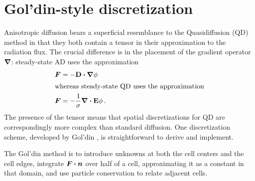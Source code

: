 \section{Gol'din-style discretization}

Anisotropic diffusion bears a superficial resemblance to the
Quasidiffusion (QD) method in that they both contain a tensor in their
approximation to the radiation flux. The crucial difference is in the placement
of the gradient operator $\bm{\nabla}$: steady-state AD uses the approximation
\begin{align*}
  \bm{F} &= - \mathbf{D} \bm{\cdot} \bm{\nabla} \phi
  \\ 
  \intertext{whereas steady-state QD uses the approximation}
  \bm{F} &= - \frac{1}{\sigma} \bm{\nabla} \bm{\cdot} \mathbf{E} \phi\,.
\end{align*}
The presence of the tensor means that spatial discretizations for QD are
correspondingly more complex than standard diffusion. One discretization scheme,
developed by Gol'din \cite{Val2002}, is straightforward to derive and implement.

The Gol'din method is to introduce unknowns at both the cell centers and the
cell edges, integrate $\bm{F}\bm{\cdot} \bm{n}$ over half of a cell, approximating
it as a constant in that domain, and use
particle conservation to relate adjacent cells.

